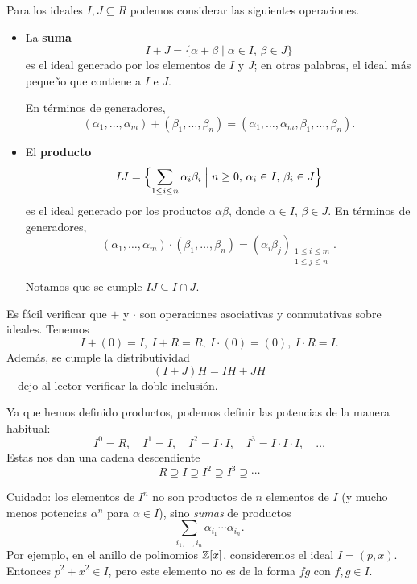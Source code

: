 \begin{definicion}
  Para los ideales $I, J \subseteq R$ podemos considerar las siguientes
  operaciones.

  \begin{itemize}
  \item La \textbf{suma}
    $$I + J = \{ \alpha + \beta \mid \alpha \in I, \, \beta \in J \}$$
    es el ideal generado por los elementos de $I$ y $J$; en otras palabras,
    el ideal más pequeño que contiene a $I$ e $J$.

    En términos de generadores,
    \[ (\alpha_1,\ldots,\alpha_m) + (\beta_1,\ldots,\beta_n) =
       (\alpha_1,\ldots,\alpha_m,\beta_1,\ldots,\beta_n). \]

  \item El \textbf{producto}
    \[ IJ = \Bigl\{ \sum_{1 \le i \le n} \alpha_i \beta_i \Bigm|
                    n \ge 0, \, \alpha_i \in I, \, \beta_i \in J  \Bigl\} \]
    es el ideal generado por los productos $\alpha\beta$, donde $\alpha \in I$, $\beta \in J$.
    En términos de generadores,
    \[ (\alpha_1,\ldots,\alpha_m) \cdot (\beta_1,\ldots,\beta_n) =
       (\alpha_i \beta_j)_{\substack{1 \le i \le m \\ 1 \le j \le n}}. \]

    Notamos que se cumple $IJ \subseteq I\cap J$.
  \end{itemize}
\end{definicion}

Es fácil verificar que $+$ y $\cdot$ son operaciones asociativas y conmutativas
sobre ideales. Tenemos
$$I + (0) = I, ~ I + R = R, ~ I \cdot (0) = (0), ~ I\cdot R = I.$$
Además, se cumple la distributividad
$$(I + J) H = IH + JH$$
---dejo al lector verificar la doble inclusión.

Ya que hemos definido productos, podemos definir las potencias de la manera
habitual:
\[ I^0 = R, \quad
I^1 = I, \quad
I^2 = I\cdot I, \quad
I^3 = I\cdot I\cdot I, \quad
\ldots \]
Estas nos dan una cadena descendiente
$$R \supseteq I \supseteq I^2 \supseteq I^3 \supseteq \cdots$$

\begin{comentario}
  Cuidado: los elementos de $I^n$ no son productos de $n$ elementos de $I$
  (y mucho menos potencias $\alpha^n$ para $\alpha \in I$), sino \emph{sumas}
  de productos
  $$\sum_{i_1,\ldots,i_n} \alpha_{i_1} \cdots \alpha_{i_n}.$$
  Por ejemplo, en el anillo de polinomios $\mathbb{Z} [x]$, consideremos el ideal
  $I = (p,x)$. Entonces $p^2 + x^2 \in I$, pero este elemento no es de la forma
  $fg$ con $f,g \in I$.
\end{comentario}

